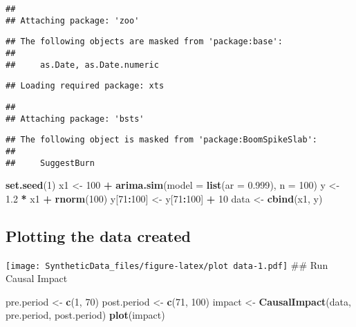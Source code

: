 \documentclass[
]{article}
\newenvironment{Shaded}{\begin{snugshade}}{\end{snugshade}}
\newcommand{\DataTypeTok}[1]{\textcolor[rgb]{0.13,0.29,0.53}{#1}}
\newcommand{\DecValTok}[1]{\textcolor[rgb]{0.00,0.00,0.81}{#1}}
\newcommand{\FloatTok}[1]{\textcolor[rgb]{0.00,0.00,0.81}{#1}}
\newcommand{\KeywordTok}[1]{\textcolor[rgb]{0.13,0.29,0.53}{\textbf{#1}}}
\newcommand{\NormalTok}[1]{#1}
\newcommand{\OperatorTok}[1]{\textcolor[rgb]{0.81,0.36,0.00}{\textbf{#1}}}
\newcommand{\StringTok}[1]{\textcolor[rgb]{0.31,0.60,0.02}{#1}}
\begin{document}
\begin{verbatim}
## 
## Attaching package: 'zoo'
\end{verbatim}

\begin{verbatim}
## The following objects are masked from 'package:base':
## 
##     as.Date, as.Date.numeric
\end{verbatim}

\begin{verbatim}
## Loading required package: xts
\end{verbatim}

\begin{verbatim}
## 
## Attaching package: 'bsts'
\end{verbatim}

\begin{verbatim}
## The following object is masked from 'package:BoomSpikeSlab':
## 
##     SuggestBurn
\end{verbatim}

\begin{Shaded}
\begin{Highlighting}[]
\KeywordTok{set.seed}\NormalTok{(}\DecValTok{1}\NormalTok{)}
\NormalTok{x1 <-}\StringTok{ }\DecValTok{100} \OperatorTok{+}\StringTok{ }\KeywordTok{arima.sim}\NormalTok{(}\DataTypeTok{model =} \KeywordTok{list}\NormalTok{(}\DataTypeTok{ar =} \FloatTok{0.999}\NormalTok{), }\DataTypeTok{n =} \DecValTok{100}\NormalTok{)}
\NormalTok{y <-}\StringTok{ }\FloatTok{1.2} \OperatorTok{*}\StringTok{ }\NormalTok{x1 }\OperatorTok{+}\StringTok{ }\KeywordTok{rnorm}\NormalTok{(}\DecValTok{100}\NormalTok{)}
\NormalTok{y[}\DecValTok{71}\OperatorTok{:}\DecValTok{100}\NormalTok{] <-}\StringTok{ }\NormalTok{y[}\DecValTok{71}\OperatorTok{:}\DecValTok{100}\NormalTok{] }\OperatorTok{+}\StringTok{ }\DecValTok{10}
\NormalTok{data <-}\StringTok{ }\KeywordTok{cbind}\NormalTok{(x1, y)}
\end{Highlighting}
\end{Shaded}

\hypertarget{plotting-the-data-created}{%
\subsection{Plotting the data created}\label{plotting-the-data-created}}

\texttt{[image: SyntheticData\_files/figure-latex/plot data-1.pdf]} \#\#
Run Causal Impact

\begin{Shaded}
\begin{Highlighting}[]
\NormalTok{pre.period <-}\StringTok{ }\KeywordTok{c}\NormalTok{(}\DecValTok{1}\NormalTok{, }\DecValTok{70}\NormalTok{)}
\NormalTok{post.period <-}\StringTok{ }\KeywordTok{c}\NormalTok{(}\DecValTok{71}\NormalTok{, }\DecValTok{100}\NormalTok{)}
\NormalTok{impact <-}\StringTok{ }\KeywordTok{CausalImpact}\NormalTok{(data, pre.period, post.period)}
\KeywordTok{plot}\NormalTok{(impact)}
\end{Highlighting}
\end{Shaded}
\end{document}
